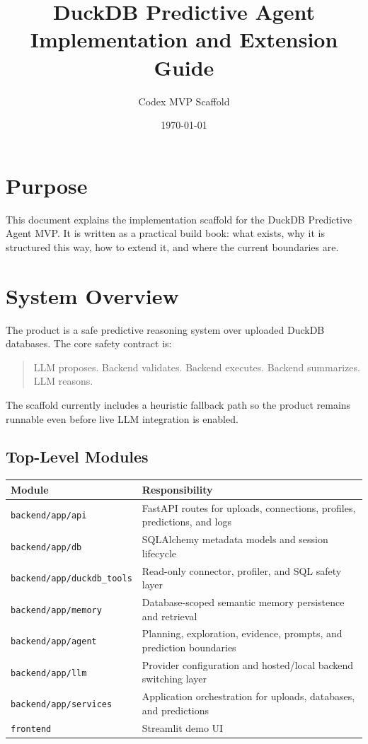 \documentclass[11pt]{book}
\title{DuckDB Predictive Agent\\Implementation and Extension Guide}
\author{Codex MVP Scaffold}
\date{\today}
\begin{document}
\maketitle
\tableofcontents

\chapter{Purpose}
This document explains the implementation scaffold for the DuckDB Predictive Agent MVP. It is
written as a practical build book: what exists, why it is structured this way, how to extend it,
and where the current boundaries are.

\chapter{System Overview}
The product is a safe predictive reasoning system over uploaded DuckDB databases. The core safety
contract is:

\begin{quote}
LLM proposes. Backend validates. Backend executes. Backend summarizes. LLM reasons.
\end{quote}

The scaffold currently includes a heuristic fallback path so the product remains runnable even
before live LLM integration is enabled.

\section{Top-Level Modules}
\begin{longtable}{|p{}|p{}|}
\hline
Module & Responsibility \\
\hline
\texttt{backend/app/api} & FastAPI routes for uploads, connections, profiles, predictions, and logs \\
\hline
\texttt{backend/app/db} & SQLAlchemy metadata models and session lifecycle \\
\hline
\texttt{backend/app/duckdb\_tools} & Read-only connector, profiler, and SQL safety layer \\
\hline
\texttt{backend/app/memory} & Database-scoped semantic memory persistence and retrieval \\
\hline
\texttt{backend/app/agent} & Planning, exploration, evidence, prompts, and prediction boundaries \\
\hline
\texttt{backend/app/llm} & Provider configuration and hosted/local backend switching layer \\
\hline
\texttt{backend/app/services} & Application orchestration for uploads, databases, and predictions \\
\hline
\texttt{frontend} & Streamlit demo UI \\
\hline
\end{longtable}
\end{document}
